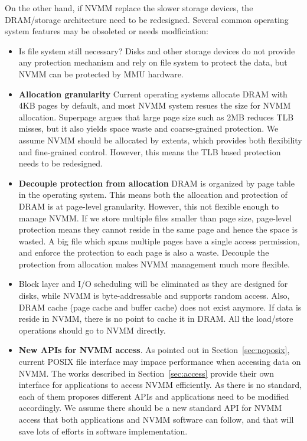 On the other hand, if NVMM replace the slower storage devices, the DRAM/storage
architecture need to be redesigned. Several common operating system features
may be obsoleted or needs modficiation:
\begin{itemize}
\item Is file system still necessary?
Disks and other storage devices do not provide any
protection mechanism and rely on file system to protect the data, but NVMM
can be protected by MMU hardware.
\item \textbf{Allocation granularity}
Current operating systems allocate DRAM with 4KB pages by default,
and most NVMM system resues the size for NVMM allocation. Superpage argues
that large page size such as 2MB reduces TLB misses, but it also yields
space waste and coarse-grained protection. We assume NVMM should be allocated
by extents, which provides both flexibility and fine-grained control. However,
this means the TLB based protection needs to be redesigned.
\item \textbf{Decouple protection from allocation} DRAM is organized by 
page table in the operating system. This means both the allocation and
protection of DRAM is at page-level granularity. However, this not flexible
enough to manage NVMM. If we store multiple files smaller than page size,
page-level protection means they cannot reside in the same page and hence
the space is wasted. A big file which spans multiple pages have a single
access permission, and enforce the protection to each page is also a waste.
Decouple the protection from allocation makes NVMM management much more
 flexible.
\item Block layer and I/O scheduling
will be eliminated as they are designed for disks,
while NVMM is byte-addressable and supports random access. Also,
DRAM cache (page cache and buffer cache) does not exist anymore. If data
is reside in NVMM, there is no point to cache it in DRAM. All the load/store
operations should go to NVMM directly.
\item \textbf{New APIs for NVMM access}.
As pointed out in Section~\ref{sec:noposix}, current POSIX file 
interface may impace performance when accessing data on NVMM.
The works described in Section~\ref{sec:access} provide their own interface
for applications to access NVMM efficiently. As there is no standard, each of
them proposes different APIs and applications need to be modified accordingly.
We assume there should be a new standard API for NVMM access that both
applications and NVMM software can follow, and that will save lots of efforts
in software implementation. 
\end{itemize}

